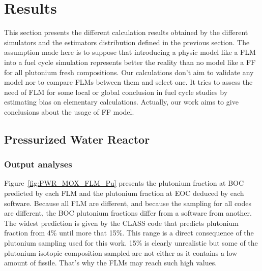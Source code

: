 
\section{Results}

This section presents the different calculation results obtained by the
different simulators and the estimators distribution defined in the previous
section.  The assumption made here is to suppose that introducing a physic model
like a \gls{FLM} into a fuel cycle simulation represents better the reality than
no model like a \gls{FF} for all plutonium fresh compositions. Our calculations
don't aim to validate any model nor to compare \gls{FLM}s between them and
select one. It tries to assess the need of \gls{FLM} for some local or global
conclusion in fuel cycle studies by estimating bias on elementary calculations.
Actually, our work aims to give conclusions about the usage of \gls{FF} model.   

\subsection{Pressurized Water Reactor}
\subsubsection{Output analyses}

Figure~\ref{fig:PWR_MOX_FLM_Pu} presents the plutonium fraction at \gls{BOC} predicted
by each \gls{FLM} and the plutonium fraction at \gls{EOC} deduced by each software. Because all
FLM are different, and because the sampling for all codes are different, the \gls{BOC} plutonium fractions differ from a software from
another. The widest prediction is given by the CLASS code that predicts plutonium
fraction from 4\% until more that 15\%. This range is a direct consequence of
the plutonium sampling used for this work. 15\% is clearly unrealistic but some
of the plutonium isotopic composition sampled are not either as it contains a low
amount of fissile. That's why the \gls{FLM}s may reach such high values.    

